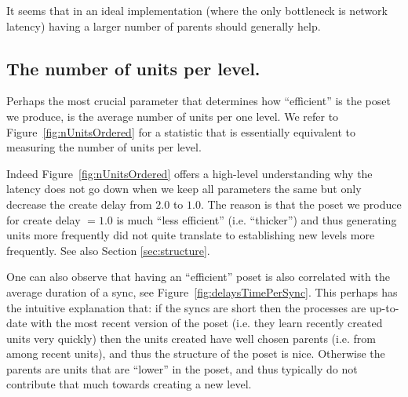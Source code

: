 \documentclass[a4paper,10pt]{article}
\begin{document}
			It seems that in an ideal implementation (where the only bottleneck is network latency) having a larger number of parents should generally help.

		\subsection{The number of units per level.}
			Perhaps the most crucial parameter that determines how ``efficient'' is the poset we produce, is the average number of units per one level.
			We refer to Figure~\ref{fig:nUnitsOrdered} for a statistic that is essentially equivalent to measuring the number of units per level.

			Indeed Figure~\ref{fig:nUnitsOrdered} offers a high-level understanding why the latency does not go down when we keep all parameters the same but only decrease the create delay from $2.0$ to $1.0$.
			The reason is that the poset we produce for create delay $=1.0$ is much ``less efficient'' (i.e. ``thicker'') and thus generating units more frequently did not quite translate to establishing new levels more frequently.
			See also Section \ref{sec:structure}.

			One can also observe that having an ``efficient'' poset is also correlated with the average duration of a sync, see Figure~\ref{fig:delaysTimePerSync}.
			This perhaps has the intuitive explanation that: if the syncs are short then the processes are up-to-date with the most recent version of the poset (i.e. they learn recently created units very quickly) then the units created have well chosen parents (i.e. from among recent units), and thus the structure of the poset is nice.
			Otherwise the parents are units that are ``lower'' in the poset, and thus typically do not contribute that much towards creating a new level.
\end{document}
